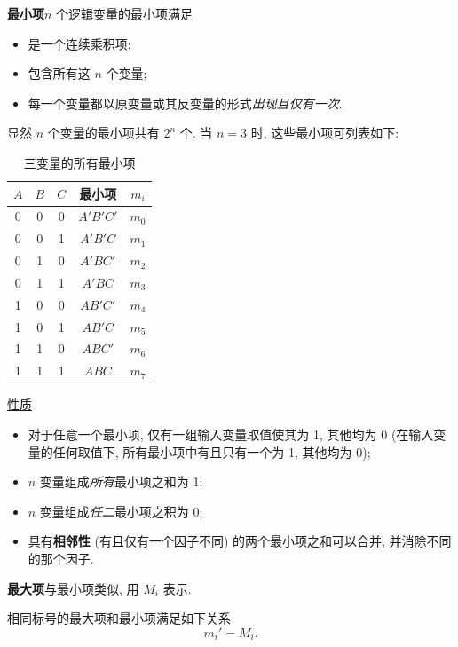 \textbf{最小项}\quad $n$ 个逻辑变量的最小项满足
\begin{itemize}
    \item 是一个连续乘积项;
    \item 包含所有这 $n$ 个变量;
    \item 每一个变量都以原变量或其反变量的形式\textit{出现且仅有一次}.
\end{itemize}
显然 $n$ 个变量的最小项共有 $2^n$ 个. 当 $n=3$ 时, 这些最小项可列表如下:
\begin{table}[H]
    \caption{三变量的所有最小项}
    \centering
    \begin{tabular}{ccccc} \toprule
        $A$ & $B$ & $C$ & \bfseries 最小项 & $m_i$ \\\midrule
        0   & 0   & 0   & $A'B'C'$      & $m_0$ \\
        0   & 0   & 1   & $A'B'C$       & $m_1$ \\
        0   & 1   & 0   & $A'BC'$       & $m_2$ \\
        0   & 1   & 1   & $A'BC$        & $m_3$ \\
        1   & 0   & 0   & $AB'C'$       & $m_4$ \\
        1   & 0   & 1   & $AB'C$        & $m_5$ \\
        1   & 1   & 0   & $ABC'$        & $m_6$ \\
        1   & 1   & 1   & $ABC$         & $m_7$ \\
        \bottomrule
    \end{tabular}
\end{table}

\underline{性质}
\begin{itemize}
    \item 对于任意一个最小项, 仅有一组输入变量取值使其为 1, 其他均为 0 (在输入变量的任何取值下, 所有最小项中有且只有一个为 1, 其他均为 0);
    \item $n$ 变量组成\textit{所有}最小项之和为 1;
    \item $n$ 变量组成\textit{任二}最小项之积为 0;
    \item 具有\textbf{相邻性} (有且仅有一个因子不同) 的两个最小项之和可以合并, 并消除不同的那个因子.
\end{itemize}

\textbf{最大项}\quad 与最小项类似, 用 $M_i$ 表示.

相同标号的最大项和最小项满足如下关系
\begin{equation}
    m_i'=M_i.
\end{equation}

